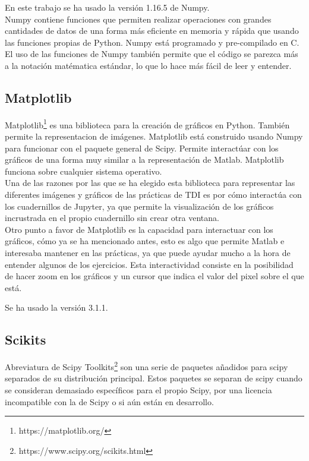 \documentclass[a4paper,12pt]{report}
\begin{document}
En este trabajo se ha usado la versión 1.16.5 de Numpy.\\

Numpy contiene funciones que permiten realizar operaciones con grandes cantidades de datos de una forma más eficiente en memoria y rápida que usando las funciones propias de Python. Numpy está programado y pre-compilado en C. El uso de las funciones de Numpy también permite que el código se parezca más a la notación matématica estándar, lo que lo hace más fácil de leer y entender.\\

\subsection{Matplotlib}

Matplotlib\footnote{https://matplotlib.org/} es una biblioteca para la creación de gráficos en Python. También permite la representacion de imágenes. Matplotlib está construido usando Numpy para funcionar con el paquete general de Scipy. Permite interactúar con los gráficos de una forma muy similar a la representación de Matlab. Matplotlib funciona sobre cualquier sistema operativo. \\

Una de las razones por las que se ha elegido esta biblioteca para representar las diferentes imágenes y gráficos de las prácticas de TDI es por cómo interactúa con los cuadernillos de Jupyter, ya que permite la visualización de los gráficos incrustrada en el propio cuadernillo sin crear otra ventana. \\

Otro punto a favor de Matplotlib es la capacidad para interactuar con los gráficos, cómo ya se ha mencionado antes, esto es algo que permite Matlab e interesaba mantener en las prácticas, ya que puede ayudar mucho a la hora de entender algunos de los ejercicios. Esta interactividad consiste en la posibilidad de hacer zoom en los gráficos y un cursor que indica el valor del pixel sobre el que está.

Se ha usado la versión 3.1.1.\\

\subsection{Scikits}

Abreviatura de Scipy Toolkits\footnote{https://www.scipy.org/scikits.html} son una serie de paquetes añadidos para scipy separados de su distribución principal. Estos paquetes se separan de scipy cuando se consideran demasiado específicos para el propio Scipy, por una licencia incompatible con la de Scipy o si aún están en desarrollo.\\
\end{document}
